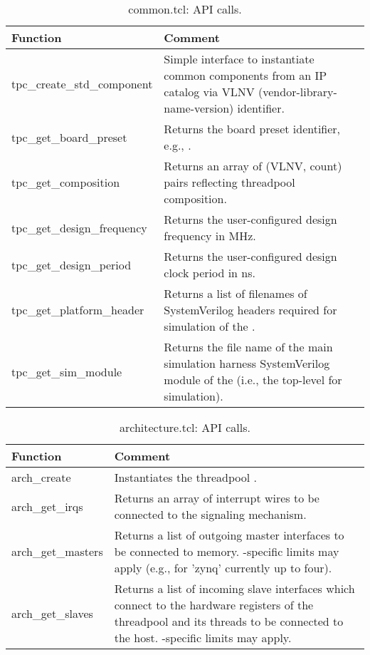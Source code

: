 %
\begin{longtable}[c]{>{\ttfamily}L{0.45\textwidth}L{0.45\textwidth}}
  \caption{common.tcl: API calls.}
  \label{tbl:common.tcl}\\
  \toprule
  \normalfont\textbf{Function} & \textbf{Comment}\\\midrule
  \endhead
  \bottomrule
  \endlastfoot
  tpc\_create\_std\_component & Simple interface to instantiate common components from an IP catalog via VLNV (vendor-library-name-version) identifier.\\\midrule
  tpc\_get\_board\_preset & Returns the board preset identifier, e.g., .\\\midrule
  tpc\_get\_composition & Returns an array of (VLNV, count) pairs reflecting threadpool composition.\\\midrule
  tpc\_get\_design\_frequency & Returns the user-configured design frequency in MHz.\\\midrule
  tpc\_get\_design\_period & Returns the user-configured design clock period in ns.\\\midrule
  tpc\_get\_platform\_header & Returns a list of filenames of SystemVerilog headers required for simulation of the .\\\midrule
  tpc\_get\_sim\_module & Returns the file name of the main simulation harness SystemVerilog module of the  (i.e., the top-level for simulation).\\
\end{longtable}
%
\begin{longtable}[c]{>{\ttfamily}L{0.45\textwidth}L{0.45\textwidth}}
  \caption{architecture.tcl: API calls.}
  \label{tbl:architecture.tcl}\\
  \toprule
  \normalfont\textbf{Function} & \textbf{Comment}\\\midrule
  \endhead
  \bottomrule
  \endlastfoot
  arch\_create & Instantiates the threadpool .\\\midrule
  arch\_get\_irqs & Returns an array of interrupt wires to be connected to the signaling mechanism.\\\midrule
  arch\_get\_masters & Returns a list of outgoing master interfaces to be connected to memory. -specific limits may apply (e.g., for 'zynq' currently up to four).\\\midrule
  arch\_get\_slaves & Returns a list of incoming slave interfaces which connect to the hardware registers of the threadpool and its threads to be connected to the host. -specific limits may apply.\\
\end{longtable}
